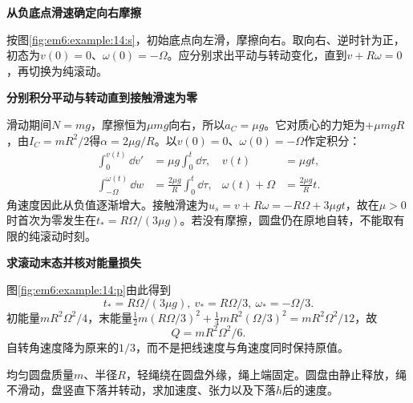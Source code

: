 \begin{solution}\textbf{从负底点滑速确定向右摩擦}\par\nobreak
按图\ref{fig:em6:example:14:s}，初始底点向左滑，摩擦向右。取向右、逆时针为正，初态为$v(0)=0$、$\omega(0)=-\Omega$。应分别求出平动与转动变化，直到$v+R\omega=0$，再切换为纯滚动。



\par\medskip{}\noindent\textbf{分别积分平动与转动直到接触滑速为零}\par\nobreak
滑动期间$N=mg$，摩擦恒为$\mu mg$向右，所以$a_C=\mu g$。它对质心的力矩为$+\mu mgR$，由$I_C=mR^2/2$得$\alpha=2\mu g/R$。以$v(0)=0$、$\omega(0)=-\Omega$作定积分：
\[
 \begin{aligned}
 \int_0^{v(t)}\dd v'&=\mu g\int_0^t\dd\tau,
 &v(t)&=\mu gt,\\
 \int_{-\Omega}^{\omega(t)}\dd w&=\frac{2\mu g}{R}\int_0^t\dd\tau,
 &\omega(t)+\Omega&=\frac{2\mu g}{R}t.
 \end{aligned}
\]
角速度因此从负值逐渐增大。接触滑速为$u_s=v+R\omega=-R\Omega+3\mu gt$，故在$\mu>0$时首次为零发生在$t_*=R\Omega/(3\mu g)$。若没有摩擦，圆盘仍在原地自转，不能取有限的纯滚动时刻。



\par\medskip{}\noindent\textbf{求滚动末态并核对能量损失}\par\nobreak
图\ref{fig:em6:example:14:p}由此得到
\[\boxed{t_*=R\Omega/(3\mu g),\ v_*=R\Omega/3,\ \omega_*=-\Omega/3}.\]
初能量$mR^2\Omega^2/4$，末能量$\tfrac12m(R\Omega/3)^2+\tfrac14mR^2(\Omega/3)^2=mR^2\Omega^2/12$，故
\[\boxed{Q=mR^2\Omega^2/6}.\]
自转角速度降为原来的$1/3$，而不是把线速度与角速度同时保持原值。\end{solution}
\begin{question}\begin{example}[沿固定绳下落的圆盘]\label{em6:example:15}
均匀圆盘质量$m$、半径$R$，轻绳绕在圆盘外缘，绳上端固定。圆盘由静止释放，绳不滑动，盘竖直下落并转动，求加速度、张力以及下落$h$后的速度。
\end{example}
\end{question}
